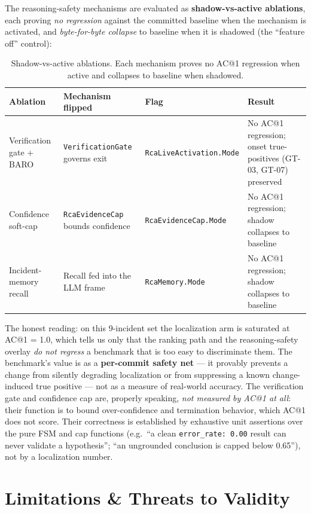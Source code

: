 \documentclass[11pt]{article}
\begin{document}
The reasoning-safety mechanisms are evaluated as \textbf{shadow-vs-active
ablations}, each proving \emph{no regression} against the committed baseline
when the mechanism is activated, and \emph{byte-for-byte collapse} to baseline
when it is shadowed (the ``feature off'' control):

\begin{table}[ht]
\centering
\caption{Shadow-vs-active ablations. Each mechanism proves no AC@1 regression
when active and collapses to baseline when shadowed.}
\label{tab:ablations}
\begin{tabular}{p{3.4cm}p{3.6cm}p{3.0cm}p{4.0cm}}
\toprule
Ablation & Mechanism flipped & Flag & Result \\
\midrule
Verification gate + BARO & \texttt{VerificationGate} governs exit & \texttt{RcaLiveActivation.Mode} & No AC@1 regression; onset true-positives (GT-03, GT-07) preserved \\
Confidence soft-cap & \texttt{RcaEvidenceCap} bounds confidence & \texttt{RcaEvidenceCap.Mode} & No AC@1 regression; shadow collapses to baseline \\
Incident-memory recall & Recall fed into the LLM frame & \texttt{RcaMemory.Mode} & No AC@1 regression; shadow collapses to baseline \\
\bottomrule
\end{tabular}
\end{table}

The honest reading: on this 9-incident set the localization arm is saturated
at AC@1 = 1.0, which tells us only that the ranking path and the
reasoning-safety overlay \emph{do not regress} a benchmark that is too easy to
discriminate them. The benchmark's value is as a \textbf{per-commit safety
net} --- it provably prevents a change from silently degrading localization or
from suppressing a known change-induced true positive --- not as a measure of
real-world accuracy. The verification gate and confidence cap are, properly
speaking, \emph{not measured by AC@1 at all}: their function is to bound
over-confidence and termination behavior, which AC@1 does not score. Their
correctness is established by exhaustive unit assertions over the pure FSM and
cap functions (e.g.\ ``a clean \texttt{error\_rate: 0.00} result can never
validate a hypothesis''; ``an ungrounded conclusion is capped below 0.65''),
not by a localization number.

\section{Limitations \& Threats to Validity}
\end{document}
